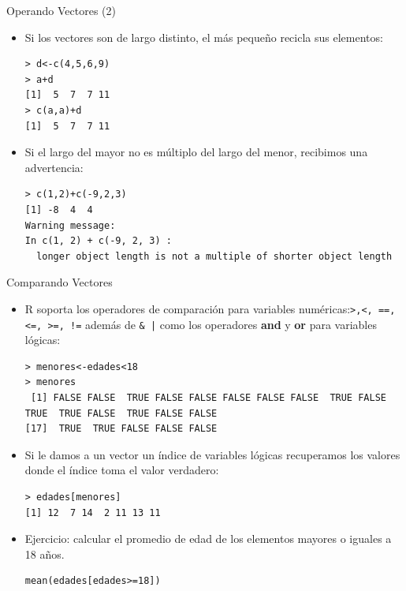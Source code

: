 \documentclass[handout]{beamer}
\begin{document}
\begin{frame}[fragile]{Operando Vectores (2)}
\scriptsize{
\begin{itemize}
\item Si los vectores son de largo distinto, el más pequeño recicla sus elementos:
\begin{verbatim}
> d<-c(4,5,6,9)
> a+d
[1]  5  7  7 11
> c(a,a)+d
[1]  5  7  7 11
\end{verbatim}

\item Si el largo del mayor no es múltiplo del largo del menor, recibimos una advertencia:
\begin{verbatim}
> c(1,2)+c(-9,2,3)
[1] -8  4  4
Warning message:
In c(1, 2) + c(-9, 2, 3) :
  longer object length is not a multiple of shorter object length 
\end{verbatim}
 
\end{itemize}
 }
\end{frame}



\begin{frame}[fragile]{Comparando Vectores}
\scriptsize{
\begin{itemize}
 \item R soporta los operadores de comparación para variables numéricas:\verb+>,<, ==, <=, >=, !=+ además de \verb+& |+ como los operadores \textbf{and} y \textbf{or} para variables lógicas:
\begin{verbatim}
> menores<-edades<18
> menores
 [1] FALSE FALSE  TRUE FALSE FALSE FALSE FALSE FALSE  TRUE FALSE  TRUE  TRUE FALSE  TRUE FALSE FALSE
[17]  TRUE  TRUE FALSE FALSE FALSE
\end{verbatim}
\item Si le damos a un vector un índice de variables lógicas recuperamos los valores donde el índice toma el valor verdadero: 
\begin{verbatim}
> edades[menores] 
[1] 12  7 14  2 11 13 11
\end{verbatim}

\item Ejercicio: calcular el promedio de edad de los elementos mayores o iguales a 18 años. 
\begin{verbatim}
mean(edades[edades>=18]) 
\end{verbatim}

 
\end{itemize}



}
\end{frame}
\end{document}
